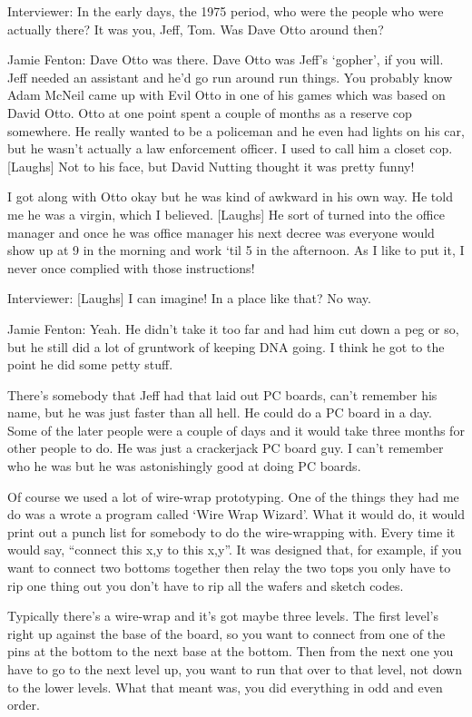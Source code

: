 \textcolor{interviewer}{Interviewer:} In the early days, the 1975 period, who were the people who were actually there? It was you, Jeff, Tom. Was Dave Otto around then?

\textcolor{interviewee}{Jamie Fenton:} Dave Otto was there. Dave Otto was Jeff’s ‘gopher’, if you will. Jeff needed an assistant and he’d go run around run things. You probably know Adam McNeil came up with Evil Otto in one of his games which was based on David Otto. Otto at one point spent a couple of months as a reserve cop somewhere. He really wanted to be a policeman and he even had lights on his car, but he wasn’t actually a law enforcement officer. I used to call him a closet cop. [Laughs] Not to his face, but David Nutting thought it was pretty funny!

I got along with Otto okay but he was kind of awkward in his own way. He told me he was a virgin, which I believed. [Laughs] He sort of turned into the office manager and once he was office manager his next decree was everyone would show up at 9 in the morning and work ‘til 5 in the afternoon. As I like to put it, I never once complied with those instructions!

\textcolor{interviewer}{Interviewer:} [Laughs] I can imagine! In a place like that? No way.

\textcolor{interviewee}{Jamie Fenton:} Yeah. He didn’t take it too far and had him cut down a peg or so, but he still did a lot of gruntwork of keeping DNA going. I think he got to the point he did some petty stuff. 

There’s somebody that Jeff had that laid out PC boards, can’t remember his name, but he was just faster than all hell. He could do a PC board in a day. Some of the later people were a couple of days and it would take three months for other people to do. He was just a crackerjack PC board guy. I can’t remember who he was but he was astonishingly good at doing PC boards.

Of course we used a lot of wire-wrap prototyping. One of the things they had me do was a wrote a program called ‘Wire Wrap Wizard’. What it would do, it would print out a punch list for somebody to do the wire-wrapping with. Every time it would say, “connect this x,y to this x,y”. It was designed that, for example, if you want to connect two bottoms together then relay the two tops you only have to rip one thing out you don’t have to rip all the wafers and sketch codes.

Typically there’s a wire-wrap and it’s got maybe three levels. The first level’s right up against the base of the board, so you want to connect from one of the pins at the bottom to the next base at the bottom. Then from the next one you have to go to the next level up, you want to run that over to that level, not down to the lower levels. What that meant was, you did everything in odd and even order. 

